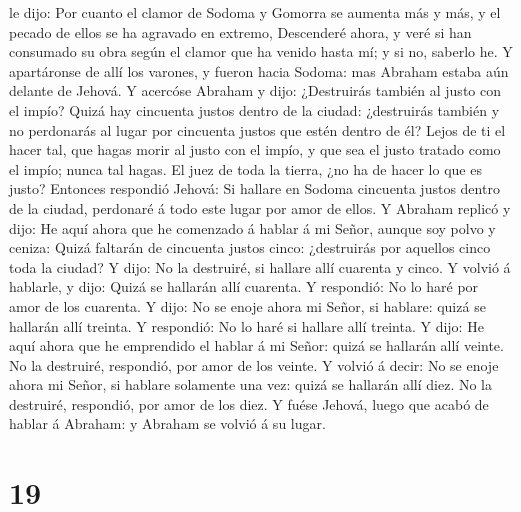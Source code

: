 le dijo: Por cuanto el clamor de Sodoma y Gomorra se aumenta más y más,
y el pecado de ellos se ha agravado en extremo, 
Descenderé ahora, y veré si han consumado su obra según el clamor que ha
venido hasta mí; y si no, saberlo he.  Y apartáronse de
allí los varones, y fueron hacia Sodoma: mas Abraham estaba aún delante
de Jehová.  Y acercóse Abraham y dijo: ¿Destruirás
también al justo con el impío?  Quizá hay cincuenta
justos dentro de la ciudad: ¿destruirás también y no perdonarás al lugar
por cincuenta justos que estén dentro de él?  Lejos de ti
el hacer tal, que hagas morir al justo con el impío, y que sea el justo
tratado como el impío; nunca tal hagas. El juez de toda la tierra, ¿no
ha de hacer lo que es justo?  Entonces respondió Jehová:
Si hallare en Sodoma cincuenta justos dentro de la ciudad, perdonaré á
todo este lugar por amor de ellos.  Y Abraham replicó y
dijo: He aquí ahora que he comenzado á hablar á mi Señor, aunque soy
polvo y ceniza:  Quizá faltarán de cincuenta justos
cinco: ¿destruirás por aquellos cinco toda la ciudad? Y dijo: No la
destruiré, si hallare allí cuarenta y cinco.  Y volvió á
hablarle, y dijo: Quizá se hallarán allí cuarenta. Y respondió: No lo
haré por amor de los cuarenta.  Y dijo: No se enoje ahora
mi Señor, si hablare: quizá se hallarán allí treinta. Y respondió: No lo
haré si hallare allí treinta.  Y dijo: He aquí ahora que
he emprendido el hablar á mi Señor: quizá se hallarán allí veinte. No la
destruiré, respondió, por amor de los veinte.  Y volvió á
decir: No se enoje ahora mi Señor, si hablare solamente una vez: quizá
se hallarán allí diez. No la destruiré, respondió, por amor de los diez.
 Y fuése Jehová, luego que acabó de hablar á Abraham: y
Abraham se volvió á su lugar.

\hypertarget{section-18}{%
\section{19}\label{section-18}}

